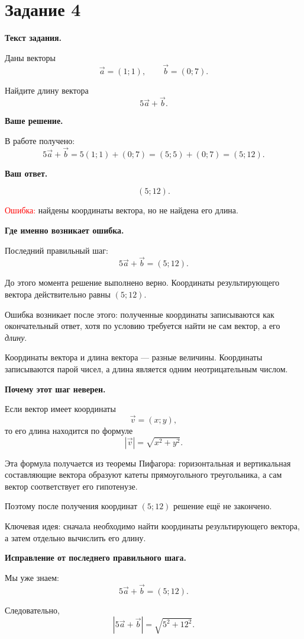 \documentclass[12pt,a4paper]{article}
\newcommand{\errorlabel}[1]{\textcolor{red}{Ошибка:} #1}
\newcommand{\keyidea}[1]{\textcolor{blue!60!black}{Ключевая идея:} #1}
\begin{document}
\newpage
{}
\label{task:4}

\section*{Задание 4}

\textbf{Текст задания.}

Даны векторы
\[
\vec a=(1;1),\qquad \vec b=(0;7).
\]

Найдите длину вектора
\[
5\vec a+\vec b.
\]

\textbf{Ваше решение.}

В работе получено:
\[
5\vec a+\vec b
=
5(1;1)+(0;7)
=
(5;5)+(0;7)
=
(5;12).
\]

\textbf{Ваш ответ.}

\[
(5;12).
\]

\errorlabel{ найдены координаты вектора, но не найдена его длина.}

\textbf{Где именно возникает ошибка.}

Последний правильный шаг:
\[
5\vec a+\vec b=(5;12).
\]

До этого момента решение выполнено верно. Координаты результирующего
вектора действительно равны $(5;12)$.

Ошибка возникает после этого: полученные координаты записываются как
окончательный ответ, хотя по условию требуется найти не сам вектор, а
его \emph{длину}.

Координаты вектора и длина вектора --- разные величины. Координаты
записываются парой чисел, а длина является одним неотрицательным числом.

\textbf{Почему этот шаг неверен.}

Если вектор имеет координаты
\[
\vec v=(x;y),
\]
то его длина находится по формуле
\[
|\vec v|=\sqrt{x^2+y^2}.
\]

Эта формула получается из теоремы Пифагора: горизонтальная и вертикальная
составляющие вектора образуют катеты прямоугольного треугольника, а сам
вектор соответствует его гипотенузе.

Поэтому после получения координат $(5;12)$ решение ещё не закончено.

\keyidea{ сначала необходимо найти координаты результирующего вектора, а затем отдельно вычислить его длину.}

\textbf{Исправление от последнего правильного шага.}

Мы уже знаем:
\[
5\vec a+\vec b=(5;12).
\]

Следовательно,
\[
|5\vec a+\vec b|
=
\sqrt{5^2+12^2}.
\]
\end{document}
